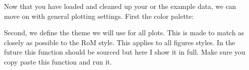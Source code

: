 \documentclass[]{article}
\newenvironment{Shaded}{\begin{snugshade}}{\end{snugshade}}
\newcommand{\KeywordTok}[1]{\textcolor[rgb]{0.13,0.29,0.53}{\textbf{#1}}}
\newcommand{\StringTok}[1]{\textcolor[rgb]{0.31,0.60,0.02}{#1}}
\newcommand{\NormalTok}[1]{#1}
\begin{document}
Now that you have loaded and cleaned up your or the example data, we can
move on with general plotting settings. First the color palette:

\begin{Shaded}
\end{Shaded}

Second, we define the theme we will use for all plots. This is made to
match as closely as possible to the RoM style. This applies to all
figures styles. In the future this function should be sourced but here I
show it in full. Make sure you copy paste this function and run it.
\end{document}

